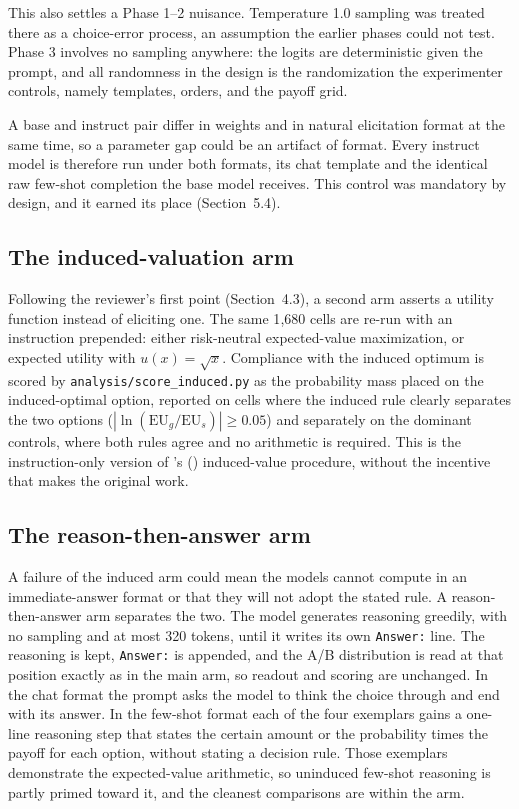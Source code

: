 \documentclass[11pt]{article}
\begin{document}
This also settles a Phase 1--2 nuisance. Temperature 1.0 sampling was treated there as a choice-error
process, an assumption the earlier phases could not test. Phase 3 involves no sampling anywhere: the
logits are deterministic given the prompt, and all randomness in the design is the randomization the
experimenter controls, namely templates, orders, and the payoff grid.

A base and instruct pair differ in weights and in natural elicitation format at the same time, so a
parameter gap could be an artifact of format. Every instruct model is therefore run under both formats,
its chat template and the identical raw few-shot completion the base model receives. This control was
mandatory by design, and it earned its place (Section~5.4).

\subsection{The induced-valuation arm}
Following the reviewer's first point (Section~4.3), a second arm asserts a utility function instead of
eliciting one. The same 1{,}680 cells are re-run with an instruction prepended: either risk-neutral
expected-value maximization, or expected utility with $u(x) = \sqrt{x}$. Compliance with the induced
optimum is scored by \texttt{analysis/score\_induced.py} as the probability mass placed on the
induced-optimal option, reported on cells where the induced rule clearly separates the two options
($|\ln(\mathrm{EU}_g/\mathrm{EU}_s)| \ge 0.05$) and separately on the dominant controls, where both
rules agree and no arithmetic is required. This is the instruction-only version of \citeauthor{smith1976}'s (\citeyear{smith1976})
induced-value procedure, without the incentive that makes the original work.

\subsection{The reason-then-answer arm}\label{sec:reasondesign}
A failure of the induced arm could mean the models cannot compute in an immediate-answer format or that
they will not adopt the stated rule. A reason-then-answer arm separates the two. The model generates
reasoning greedily, with no sampling and at most 320 tokens, until it writes its own \texttt{Answer:}
line. The reasoning is kept, \texttt{Answer:} is appended, and the A/B distribution is read at that
position exactly as in the main arm, so readout and scoring are unchanged. In the chat format the prompt
asks the model to think the choice through and end with its answer. In the few-shot format each of the
four exemplars gains a one-line reasoning step that states the certain amount or the probability times
the payoff for each option, without stating a decision rule. Those exemplars demonstrate the
expected-value arithmetic, so uninduced few-shot reasoning is partly primed toward it, and the cleanest
comparisons are within the arm.
\end{document}
